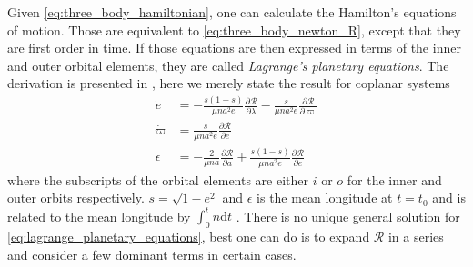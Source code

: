 \documentclass[ twoside,openright,titlepage,numbers=noenddot,headinclude,%
                footinclude=true,cleardoublepage=empty,abstractoff, %
                BCOR=5mm,paper=a4,fontsize=11pt,%
                american,%
                ]{scrreprt}
\begin{document}
Given 
\cref{eq:three_body_hamiltonian}, one can calculate the Hamilton's equations of
motion. Those are equivalent to \cref{eq:three_body_newton_R}, except that they
are first order in time. If those equations are then expressed in terms
of the inner and outer orbital elements, they are called 
\emph{Lagrange's planetary equations}. The derivation is presented
in \cite[for ex.][]{brouwer1961}, here we merely state the result for coplanar
systems
\begin{equation}
\begin{aligned}
    \dot{e}&= -\frac{s(1-s)}{\mu na^2e} 
    \frac{\partial\mathcal{R}}{\partial\lambda}
    -\frac{s}{\mu na^2e} 
    \frac{\partial\mathcal{R}}{\partial\varpi}\\
    \dot{\varpi}&= \frac{s}{\mu na^2e} 
    \frac{\partial\mathcal{R}}{\partial e}\\
    \dot{\epsilon}&=- \frac{2}{\mu n a} 
    \frac{\partial\mathcal{R}}{\partial a}
   +\frac{s(1-s)}{\mu na^2e} 
    \frac{\partial\mathcal{R}}{\partial e} 
\end{aligned}
    \label{eq:lagrange_planetary_equations}
\end{equation}
where the subscripts of the orbital elements are either $i$
or $o$ for the inner and outer orbits respectively. $s=\sqrt{1-e^2}$
and $\epsilon$ is the mean longitude at $t=t_0$ and is related
to the mean longitude by $\int^t_0 n\mathrm{d}t$ 
\citep[see.][for details]{Mardling2013}. There is no unique general 
solution for \cref{eq:lagrange_planetary_equations}, best one can do
is to expand $\mathcal{R}$ in a series and consider a few dominant
terms in certain cases.
\end{document}
